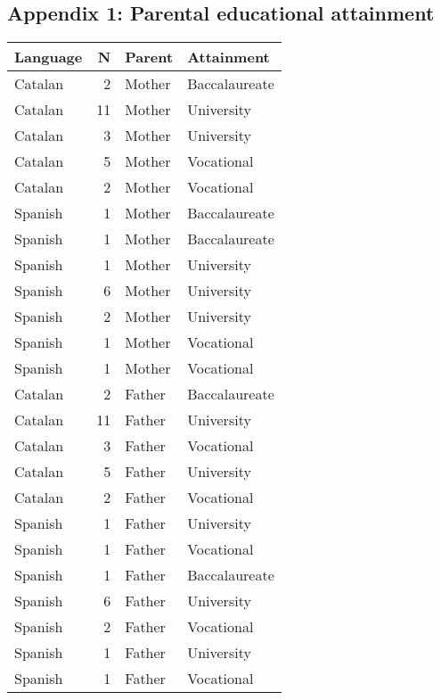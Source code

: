 \clearpage
\makeatletter
\efloat@restorefloats
\makeatother


\begin{appendix}
\hypertarget{appendix-1-parental-educational-attainment}{%
\section{Appendix 1: Parental educational
attainment}\label{appendix-1-parental-educational-attainment}}

\begin{tabular}{l|r|l|l}
\hline
Language & N & Parent & Attainment\\
\hline
Catalan & 2 & Mother & Baccalaureate\\
\hline
Catalan & 11 & Mother & University\\
\hline
Catalan & 3 & Mother & University\\
\hline
Catalan & 5 & Mother & Vocational\\
\hline
Catalan & 2 & Mother & Vocational\\
\hline
Spanish & 1 & Mother & Baccalaureate\\
\hline
Spanish & 1 & Mother & Baccalaureate\\
\hline
Spanish & 1 & Mother & University\\
\hline
Spanish & 6 & Mother & University\\
\hline
Spanish & 2 & Mother & University\\
\hline
Spanish & 1 & Mother & Vocational\\
\hline
Spanish & 1 & Mother & Vocational\\
\hline
Catalan & 2 & Father & Baccalaureate\\
\hline
Catalan & 11 & Father & University\\
\hline
Catalan & 3 & Father & Vocational\\
\hline
Catalan & 5 & Father & University\\
\hline
Catalan & 2 & Father & Vocational\\
\hline
Spanish & 1 & Father & University\\
\hline
Spanish & 1 & Father & Vocational\\
\hline
Spanish & 1 & Father & Baccalaureate\\
\hline
Spanish & 6 & Father & University\\
\hline
Spanish & 2 & Father & Vocational\\
\hline
Spanish & 1 & Father & University\\
\hline
Spanish & 1 & Father & Vocational\\
\hline
\end{tabular}
\end{appendix}
